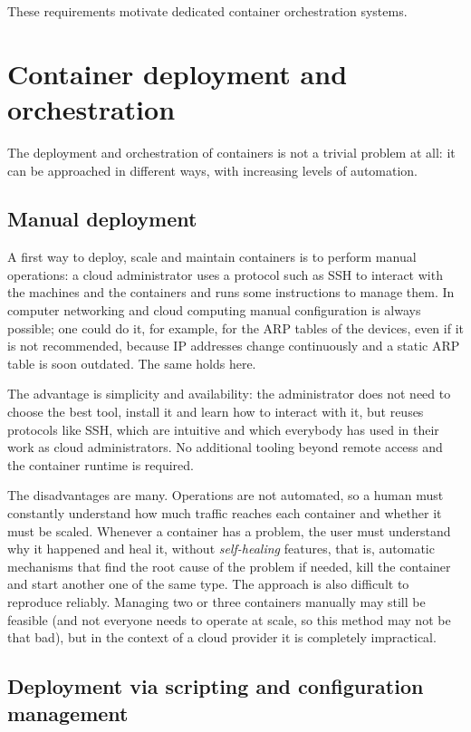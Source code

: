 These requirements motivate dedicated container orchestration systems.

\section{Container deployment and orchestration}

The deployment and orchestration of containers is not a trivial problem at all: it can be approached in different ways, with increasing levels of automation.

\subsection{Manual deployment}

A first way to deploy, scale and maintain containers is to perform manual operations: a cloud administrator uses a protocol such as SSH to interact with the machines and the containers and runs some instructions to manage them. In computer networking and cloud computing manual configuration is always possible; one could do it, for example, for the ARP tables of the devices, even if it is not recommended, because IP addresses change continuously and a static ARP table is soon outdated. The same holds here.

The advantage is simplicity and availability: the administrator does not need to choose the best tool, install it and learn how to interact with it, but reuses protocols like SSH, which are intuitive and which everybody has used in their work as cloud administrators. No additional tooling beyond remote access and the container runtime is required.

The disadvantages are many. Operations are not automated, so a human must constantly understand how much traffic reaches each container and whether it must be scaled. Whenever a container has a problem, the user must understand why it happened and heal it, without \emph{self-healing} features, that is, automatic mechanisms that find the root cause of the problem if needed, kill the container and start another one of the same type. The approach is also difficult to reproduce reliably. Managing two or three containers manually may still be feasible (and not everyone needs to operate at scale, so this method may not be that bad), but in the context of a cloud provider it is completely impractical.

\subsection{Deployment via scripting and configuration management}

